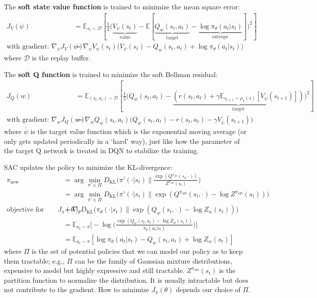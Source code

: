 \documentclass[lang=en,mode=normal,device=normal,color=blue,12pt]{elegantnote}
\DeclareMathOperator*{\1}{\mathbbm{1}}
\begin{document}
The \textbf{soft state value function} is trained to minimize the mean square error:
\begin{align*}
J_V(\psi) &= \mathbb{E}_{s_t \sim \mathcal{D}} [\frac{1}{2} \big( \underbrace{V_\psi(s_t)}_\text{value} - \mathbb{E}[\underbrace{Q_w(s_t, a_t)}_\text{target} - \underbrace{\log \pi_\theta(a_t \vert s_t)}_\text{entropy}] \big)^2] \\
\text{with gradient: }\nabla_\psi J_V(\psi) &= \nabla_\psi V_\psi(s_t)\big( V_\psi(s_t) - Q_w(s_t, a_t) + \log \pi_\theta (a_t \vert s_t) \big)
\end{align*}
where $\mathcal{D}$ is the replay buffer.

The \textbf{soft Q function} is trained to minimize the soft Bellman residual:
\begin{align*}
J_Q(w) &= \mathbb{E}_{(s_t, a_t) \sim \mathcal{D}} [\frac{1}{2}\big( Q_w(s_t, a_t) - \underbrace{(r(s_t, a_t) + \gamma \mathbb{E}_{s_{t+1} \sim \rho_\pi(s)}[V_{\bar{\psi}}(s_{t+1})])}_\text{target} \big)^2] \\
\text{with gradient: } \nabla_w J_Q(w) &= \nabla_w Q_w(s_t, a_t) \big( Q_w(s_t, a_t) - r(s_t, a_t) - \gamma V_{\bar{\psi}}(s_{t+1})\big)
\end{align*}
where $\bar{\psi}$ is the target value function which is the exponential moving average (or only gets updated periodically in a `hard' way), just like how the parameter of the target Q network is treated in DQN to stabilize the training.

SAC updates the policy to minimize the KL-divergence:
\begin{align*}
\pi_\text{new} 
&= \arg\min_{\pi' \in \Pi} D_\text{KL} \Big( \pi'(\cdot | s_t) \| \frac{\exp(Q^{\pi_\text{old}}(s_t, \cdot))}{Z^{\pi_\text{old}}(s_t)} \Big) \\[6pt]
&= \arg\min_{\pi' \in \Pi} D_\text{KL} \big( \pi'(\cdot | s_t) \| \exp(Q^{\pi_\text{old}}(s_t, \cdot) - \log Z^{\pi_\text{old}}(s_t)) \big) \\[6pt]
\text{objective for update: } J_\pi(\theta) &= \nabla_\theta D_\text{KL} \big( \pi_\theta(\cdot | s_t) \| \exp(Q_w(s_t, \cdot) - \log Z_w(s_t)) \big) \\[6pt]
&= \mathbb{E}_{a_t\sim\pi} \Big[ - \log \big( \frac{\exp(Q_w(s_t, a_t) - \log Z_w(s_t))}{\pi_\theta(a_t | s_t)} \big) \Big] \\[6pt]
&= \mathbb{E}_{a_t\sim\pi} [ \log \pi_\theta(a_t | s_t) - Q_w(s_t, a_t) + \log Z_w(s_t) ]
\end{align*}
where $\Pi$ is the set of potential policies that we can model our policy as to keep them tractable; e.g., $\Pi$ can be the family of Gaussian mixture distributions, expensive to model but highly expressive and still tractable.
$Z^{\pi_{\text{old}}}(s_t)$ is the partition function to normalize the distribution.
It is usually intractable but does not contribute to the gradient. How to minimize $J_\pi (\theta)$ depends our choice of $\Pi$.
\end{document}
